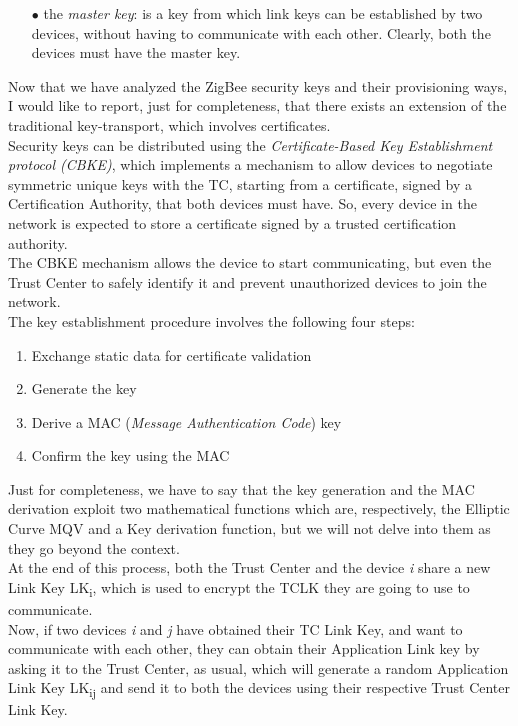 \documentclass[12pt]{report}
\begin{document}
\begin{itemize}
\item[$\bullet$] the \emph{master key}: is a key from which link keys can be established by two devices, without having to communicate with each other. Clearly, both the devices must have the master key.

\end{itemize}

Now that we have analyzed the ZigBee security keys and their provisioning ways, I would like to report, just for completeness, that there exists an extension of the traditional key-transport, which involves certificates.\\
Security keys can be distributed using the \emph{Certificate-Based Key Establishment protocol (CBKE)}, which implements a mechanism to allow devices to negotiate symmetric unique keys with the TC, starting from a certificate, signed by a Certification Authority, that both devices must have. So, every device in the network is expected to store a certificate signed by a trusted certification authority.\\
The CBKE mechanism allows the device to start communicating, but even the Trust Center to safely identify it and prevent unauthorized devices to join the network.\\
The key establishment procedure involves the following four steps:

\begin{enumerate}
\setlength{\itemindent}{+5mm}
\item Exchange static data for certificate validation
\item Generate the key
\item Derive a MAC (\emph{Message Authentication Code}) key
\item Confirm the key using the MAC
 \end{enumerate}

Just for completeness, we have to say that the key generation and the MAC derivation exploit two mathematical functions which are, respectively, the Elliptic Curve MQV and a Key derivation function, but we will not delve into them as they go beyond the context.\\
At the end of this process, both the Trust Center and the device \emph{i} share a new Link Key LK\textsubscript{i}, which is used to encrypt the TCLK they are going to use to communicate.\\
Now, if two devices \emph{i} and \emph{j} have obtained their TC Link Key, and want to communicate with each other, they can obtain their Application Link key by asking it to the Trust Center, as usual, which will generate a random Application Link Key LK\textsubscript{ij} and send it to both the devices using their respective Trust Center Link Key.\\
\end{document}
